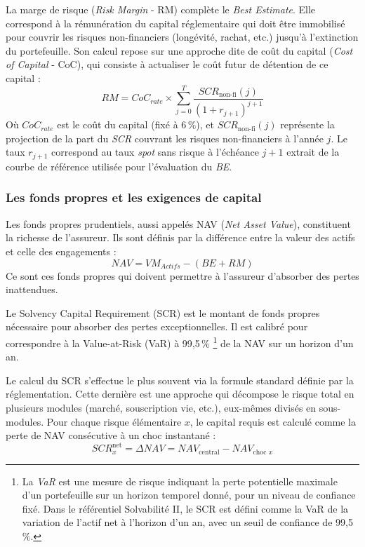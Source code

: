 La marge de risque (\textit{Risk Margin} - RM) complète le \textit{Best Estimate}. Elle correspond à la rémunération du capital réglementaire qui doit être immobilisé pour couvrir les risques non-financiers (longévité, rachat, etc.) jusqu'à l'extinction du portefeuille. Son calcul repose sur une approche dite de coût du capital (\textit{Cost of Capital} - CoC), qui consiste à actualiser le coût futur de détention de ce capital :
\begin{equation}
    RM = \textit{CoC}_{\textit{rate}} \times \sum_{j=0}^{T} \frac{\textit{SCR}_{\text{non-fi}}(j)}{(1+r_{j+1})^{j+1}}
\end{equation}
Où $\textit{CoC}_{\textit{rate}}$ est le coût du capital (fixé à $6\,\%$), et $\textit{SCR}_{\text{non-fi}}(j)$ représente la projection de la part du \textit{SCR} couvrant les risques non-financiers à l'année $j$. Le taux $r_{j+1}$ correspond au taux \textit{spot} sans risque à l'échéance $j+1$ extrait de la courbe de référence utilisée pour l'évaluation du \textit{BE}.

\subsubsection{Les fonds propres et les exigences de capital}

Les fonds propres prudentiels, aussi appelés NAV (\textit{Net Asset Value}), constituent la richesse de l'assureur. Ils sont définis par la différence entre la valeur des actifs et celle des engagements :
\begin{equation}
    NAV = VM_{Actifs} - (BE + RM)
\end{equation}
Ce sont ces fonds propres qui doivent permettre à l'assureur d'absorber des pertes inattendues. 

Le Solvency Capital Requirement (SCR) est le montant de fonds propres nécessaire pour absorber des pertes exceptionnelles. Il est calibré pour correspondre à la Value-at-Risk (VaR) à 99,5\,\% \footnote{La \textit{VaR} est une mesure de risque indiquant la perte potentielle maximale d'un portefeuille sur un horizon temporel donné, pour un niveau de confiance fixé. Dans le référentiel Solvabilité II, le SCR est défini comme la VaR de la variation de l'actif net à l'horizon d'un an, avec un seuil de confiance de 99,5\,\%.} de la NAV sur un horizon d'un an. 

Le calcul du SCR s'effectue le plus souvent via la formule standard définie par la réglementation. Cette dernière est une approche qui décompose le risque total en plusieurs modules (marché, souscription vie, etc.), eux-mêmes divisés en sous-modules. Pour chaque risque élémentaire $x$, le capital requis est calculé comme la perte de NAV consécutive à un choc instantané :
\begin{equation}
    SCR_{x}^{\text{net}} = \Delta NAV = NAV_{\text{central}} - NAV_{\text{choc } x}
\end{equation}

